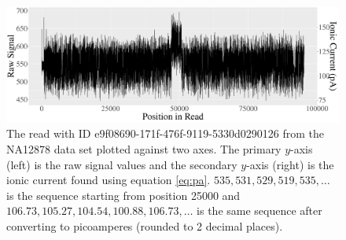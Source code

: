 \begin{figure}
\centering
\includegraphics[scale=0.31]{plots/reads.e9f08690-171f-476f-9119-5330d0290126.raw.pa.pdf}
	\caption{\label{fig:read-e9f-pa}The read with ID e9f08690-171f-476f-9119-5330d0290126 from the NA12878 data set plotted against two axes. The primary $y$-axis (left) is the raw signal values and the secondary $y$-axis (right) is the ionic current found using equation \ref{eq:pa}. $535, 531, 529, 519, 535,\dots$ is the sequence starting from position 25000 and $106.73, 105.27, 104.54, 100.88, 106.73,\dots$ is the same sequence after converting to picoamperes (rounded to 2 decimal places).}
\end{figure}
